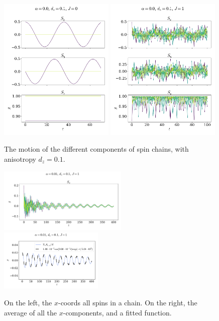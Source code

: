 \documentclass{article}
\begin{document}
    \begin{figure}[H]
        \centering
        \includegraphics[width=0.49\textwidth]{../plots/2221.pdf}
        \includegraphics[width=0.49\textwidth]{../plots/2222.pdf}
        \caption{The motion of the different components of spin chains, with anisotropy $d_z=0.1$.}
        \label{one tilted}
    \end{figure}

    \begin{figure}[H]
        \centering
        \includegraphics[width=0.55\textwidth]{../plots/2224.pdf}
        \includegraphics[width=0.44\textwidth]{../plots/2224fit.pdf}
        \caption{On the left, the $x$-coords all spins in a chain. On the right, the average of all the $x$-components, and a fitted function.}
        \label{one tilted dampend}
    \end{figure}
\end{document}

